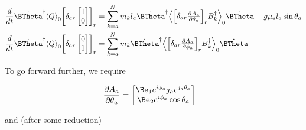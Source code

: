 \begin{align}\label{eqn:multiPendulumSpherical2:boo7}
\frac{d}{dt}
\dot{\BTheta}^\dagger
\gpgradezero{Q}
{\begin{bmatrix}
\delta_{ar}
\begin{bmatrix}
1 \\
0
\end{bmatrix}
\end{bmatrix}}_r
&=
\sum_{k=a}^N m_k l_a
\dot{\BTheta}^\dagger
\gpgradezero{
{\begin{bmatrix}
\delta_{ar}
\PD{\theta_a}{A_a} \\
\end{bmatrix}}_r
B_k^\dagger }
\dot{\BTheta}
-g \mu_a l_a \sin\theta_a \\
\frac{d}{dt}
\dot{\BTheta}^\dagger
\gpgradezero{Q}
{\begin{bmatrix}
\delta_{ar}
\begin{bmatrix}
0 \\
1
\end{bmatrix}
\end{bmatrix}}_r
&=
\sum_{k=a}^N m_k
\dot{\BTheta}^\dagger
\gpgradezero{
{\begin{bmatrix}
\delta_{ar}
\PD{\phi_a}{A_a} \\
\end{bmatrix}}_r
B_k^\dagger }
\dot{\BTheta}
\end{align}

To go forward further, we require

\begin{align}\label{eqn:multiPendulumSpherical2:boo10}
\PD{\theta_a}{A_a} &=
\begin{bmatrix}
\Be_1 e^{i \phi_a} j_a e^{j_a \theta_a} \\
\Be_2 e^{i \phi_a} \cos\theta_a
\end{bmatrix}
\end{align}

and (after some reduction)

